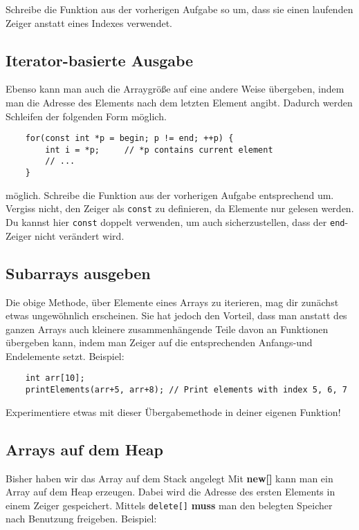 Schreibe die Funktion aus der vorherigen Aufgabe so um, dass sie einen laufenden Zeiger anstatt eines Indexes verwendet.

\subsection{Iterator-basierte Ausgabe}
Ebenso kann man auch die Arraygröße auf eine andere Weise übergeben, indem man die Adresse des Elements nach dem letzten Element angibt.
Dadurch werden Schleifen der folgenden Form möglich.

\begin{lstlisting}
	for(const int *p = begin; p != end; ++p) {
		int i = *p;		// *p contains current element
		// ...
	}
\end{lstlisting}

möglich.
Schreibe die Funktion aus der vorherigen Aufgabe entsprechend um.
Vergiss nicht, den Zeiger als \texttt{const} zu definieren, da Elemente nur gelesen werden.
Du kannst hier \texttt{const} doppelt verwenden, um auch sicherzustellen, dass der \texttt{end}-Zeiger nicht verändert wird.

\subsection{Subarrays ausgeben}
Die obige Methode, über Elemente eines Arrays zu iterieren, mag dir zunächst etwas ungewöhnlich erscheinen.
Sie hat jedoch den Vorteil, dass man anstatt des ganzen Arrays auch kleinere zusammenhängende Teile davon an Funktionen übergeben kann, indem man Zeiger auf die entsprechenden Anfangs-und Endelemente setzt.
Beispiel:

\begin{lstlisting}
	int arr[10];
	printElements(arr+5, arr+8); // Print elements with index 5, 6, 7
\end{lstlisting}

Experimentiere etwas mit dieser Übergabemethode in deiner eigenen Funktion!

\subsection{Arrays auf dem Heap}
Bisher haben wir das Array auf dem Stack angelegt
Mit \textbf{new[]} kann man ein Array auf dem Heap erzeugen.
Dabei wird die Adresse des ersten Elements in einem Zeiger gespeichert.
Mittels \texttt{delete[]} \textbf{muss} man den belegten Speicher nach Benutzung freigeben.
Beispiel:

